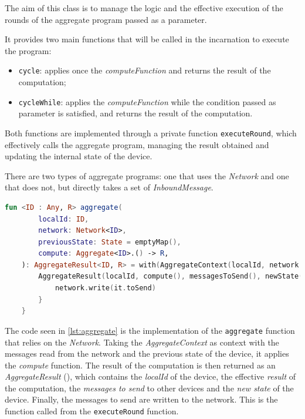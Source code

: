 The aim of this class is to manage the logic and the effective execution of the rounds of the aggregate program passed as a parameter.

It provides two main functions that will be called in the incarnation to execute the program:
\begin{itemize}
    \item \texttt{cycle}: applies once the \emph{computeFunction} and returns the result of the computation;
    \item \texttt{cycleWhile}: applies the \emph{computeFunction} while the condition passed as parameter is satisfied,
        and returns the result of the computation.
\end{itemize}

Both functions are implemented through a private function \texttt{executeRound}, which effectively calls the aggregate program,
managing the result obtained and updating the internal state of the device.

There are two types of aggregate programs: one that uses the \emph{Network} and one that does not, but directly takes
a set of \emph{InboundMessage}.

\begin{lstlisting}[language=kt,label={lst:aggregate}, caption={The signature of the \texttt{aggregate program}.}]
fun <ID : Any, R> aggregate(
        localId: ID,
        network: Network<ID>,
        previousState: State = emptyMap(),
        compute: Aggregate<ID>.() -> R,
    ): AggregateResult<ID, R> = with(AggregateContext(localId, network.read(), previousState)) {
        AggregateResult(localId, compute(), messagesToSend(), newState()).also {
            network.write(it.toSend)
        }
    }
\end{lstlisting}

The code seen in \ref{lst:aggregate} is the implementation of the \texttt{aggregate} function that relies on the \emph{Network}.
Taking the \emph{AggregateContext} as context with the messages read from the network and the previous state of the
device, it applies the \emph{compute} function.
The result of the computation is then returned as an \emph{AggregateResult} (), which contains the \emph{localId} of the device,
the effective \emph{result} of the computation, the \emph{messages to send} to other devices and the \emph{new state} of the device.
Finally, the messages to send are written to the network.
This is the function called from the \texttt{executeRound} function.

